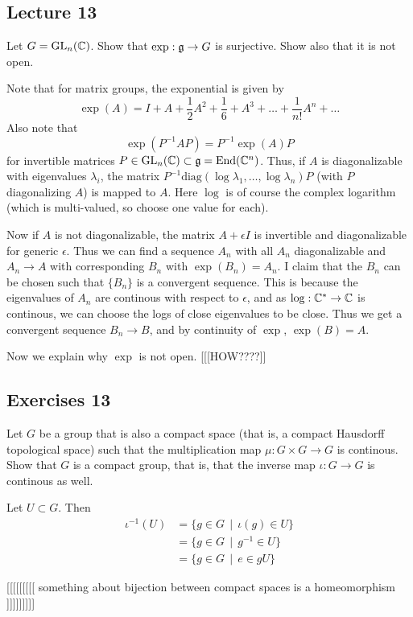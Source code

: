 \documentclass[11pt, english]{article}
\begin{document}
\subsection{Lecture 13}
\begin{exc}
 Let $G = \operatorname{GL}_n(\mathbb{C})$. Show that $\exp:\frak g \to G$ is surjective. Show also that it is not open.
\end{exc}
\begin{sol}
Note that for matrix groups, the exponential is given by
$$
\exp(A) = I + A + \frac 12 A^2 + \frac 16+A^3 + \ldots+\frac{1}{n!}A^n + \ldots
$$
Also note that
$$
\exp(P^{-1}AP) = P^{-1} \exp(A) P
$$
for invertible matrices $P \in \operatorname{GL}_n(\mathbb{C}) \subset \frak g=\operatorname{End}(\mathbb{C}^n)$. Thus, if $A$ is diagonalizable with eigenvalues $\lambda_i$, the matrix $P^{-1}\text{diag}(\log \lambda_1,\ldots,\log \lambda_n)P$ (with $P$ diagonalizing $A$) is mapped to $A$. Here $\log$ is of course the complex logarithm (which is multi-valued, so choose one value for each).

Now if $A$ is not diagonalizable, the matrix $A+\epsilon I$ is invertible and diagonalizable for generic $\epsilon$. Thus we can find a sequence $A_n$ with all $A_n$ diagonalizable and $A_n \to A$ with corresponding $B_n$ with $\exp(B_n)=A_n$. I claim that the $B_n$ can be chosen such that $\{ B_n \}$ is a convergent sequence.  This is because the eigenvalues of $A_n$ are continous with respect to $\epsilon$, and as $\log:\mathbb{C}^\ast \to \mathbb{C}$ is continous, we can choose the logs of close eigenvalues to be close. Thus we get a convergent sequence $B_n \to B$, and by continuity of $\exp$, $\exp(B)=A$.

Now we explain why $\exp$ is not open. [[[HOW????]]
\end{sol}

\subsection{Exercises 13}

\begin{exc}[Exercise 1]

Let $G$ be a group that is also a compact space (that is, a compact Hausdorff topological space) such that the multiplication map $\mu:G \times G \to G$ is continous. Show that $G$ is a compact group, that is, that the inverse map $\iota:G \to G$ is continous as well.
\end{exc}

\begin{sol}
 Let $U \subset G$. Then
 \begin{align*}
   \iota^{-1}(U) &= \{ g \in G \, \mid \, \iota(g) \in U \} \\
&= \{ g \in G \, \mid \, g^{-1} \in U \}  \\
&= \{ g \in G \, \mid \, e \in gU \}
 \end{align*}

[[[[[[[[[ something about bijection between compact spaces is a homeomorphism ]]]]]]]]]
\end{sol}
\end{document}
